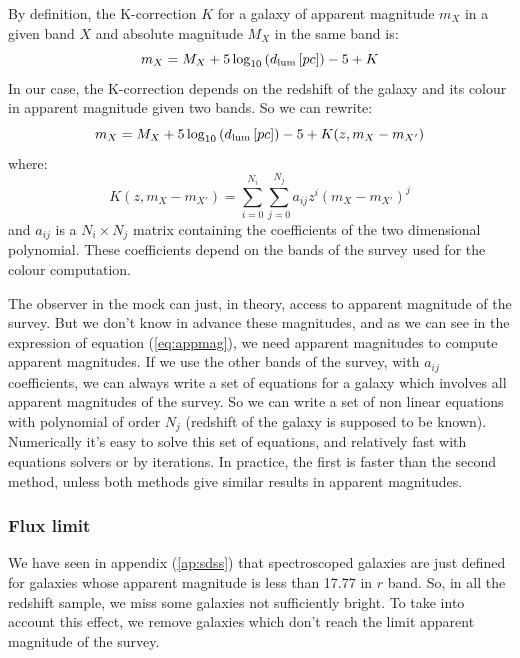 By definition, the K-correction $K$ for a galaxy of apparent magnitude $m_X$ in
a given band $X$ and absolute magnitude $M_X$ in the same band is:
%
\begin{equation}
    {m_X}={M_X} + {5\log_{10}\left({d_{\mathrm{lum}}\left[pc\right]}\right)} - 5 + K
\end{equation}
%
In our case, the K-correction depends on the redshift of the galaxy and its
colour in apparent magnitude given two bands. So we can rewrite:
%
\begin{equation}\label{eq:appmag}
    m_X = M_X + 5\log_{10}\left({d_{\mathrm{lum}}\left[pc\right]}\right) - 5 + K( z, m_X - m_{X'} )
\end{equation}
%
where:
%
\begin{equation}
    K(z,m_{X}-{m}_{X'})=\sum_{i=0}^{N_i}\sum_{j=0}^{N_j}{a_{ij}}{z^i}{{(m_X-{m}_{X'})}^j}
\end{equation}
%
and $a_{ij}$ is a ${N_i}\times{N_j}$ matrix containing the coefficients of the
two dimensional polynomial. These coefficients depend on the bands of the
survey used for the colour computation.

The observer in the mock can just, in theory, access to apparent magnitude of
the survey. But we don't know in advance these magnitudes, and as we can see in
the expression of equation (\ref{eq:appmag}), we need apparent magnitudes to
compute apparent magnitudes. If we use the other bands of the survey, with
$a_{ij}$ coefficients, we can always write a set of equations for a galaxy
which involves all apparent magnitudes of the survey. So we can write a set of
non linear equations with polynomial of order $N_j$ (redshift of the galaxy is
supposed to be known). Numerically it's easy to solve this set of equations,
and relatively fast with equations solvers or by iterations. In practice, the
first is faster than the second method, unless both methods give similar
results in apparent magnitudes.
%
\subsubsection{Flux limit}
%
We have seen in appendix (\ref{ap:sdss}) that spectroscoped galaxies are just
defined for galaxies whose apparent magnitude is less than 17.77 in $r$
band. So, in all the redshift sample, we miss some galaxies not sufficiently
bright. To take into account this effect, we remove galaxies which don't reach
the limit apparent magnitude of the survey.
%
